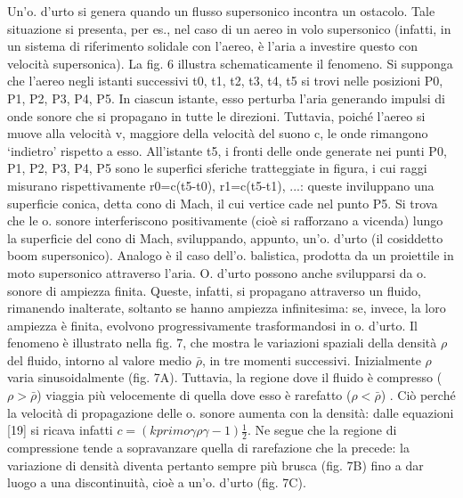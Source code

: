 \documentclass[a4paper]{article}
\begin{document}
Un'o. d'urto si genera quando un flusso supersonico incontra un ostacolo. Tale situazione si presenta, per es., nel caso di un aereo in volo supersonico (infatti, in un sistema di riferimento solidale con l'aereo, è l'aria a investire questo con velocità supersonica). La fig. 6 illustra schematicamente il fenomeno. Si supponga che l'aereo negli istanti successivi t0, t1, t2, t3, t4, t5 si trovi nelle posizioni P0, P1, P2, P3, P4, P5. In ciascun istante, esso perturba l'aria generando impulsi di onde sonore che si propagano in tutte le direzioni. Tuttavia, poiché l'aereo si muove alla velocità v, maggiore della velocità del suono c, le onde rimangono ‘indietro' rispetto a esso. All'istante t5, i fronti delle onde generate nei punti P0, P1, P2, P3, P4, P5 sono le superfici sferiche tratteggiate in figura, i cui raggi misurano rispettivamente r0=c(t5-t0), r1=c(t5-t1), ...: queste inviluppano una superficie conica, detta cono di Mach, il cui vertice cade nel punto P5. Si trova che le o. sonore interferiscono positivamente (cioè si rafforzano a vicenda) lungo la superficie del cono di Mach, sviluppando, appunto, un'o. d'urto (il cosiddetto boom supersonico). 
Analogo è il caso dell'o. balistica, prodotta da un proiettile in moto supersonico attraverso l'aria. O. d'urto possono anche svilupparsi da o. sonore di ampiezza finita. 
Queste, infatti, si propagano attraverso un fluido, rimanendo inalterate, soltanto se hanno ampiezza infinitesima: se, invece, la loro ampiezza è finita, evolvono progressivamente trasformandosi in o. d'urto. Il fenomeno è illustrato nella fig. 7, che mostra le variazioni spaziali della densità $\rho$ del fluido, intorno al valore medio $\bar{\rho}$, in tre momenti successivi. 
Inizialmente $\rho$ varia sinusoidalmente (fig. 7A). Tuttavia, la regione dove il fluido è compresso ($\rho>\bar{\rho}$) viaggia più velocemente di quella dove esso è rarefatto ($\rho<\bar{\rho}$) . 
Ciò perché la velocità di propagazione delle o. sonore aumenta con la densità: dalle equazioni [19] si ricava infatti 
$c=(k primo \gamma\rho \gamma-1)\frac{1}{2}$. 
Ne segue che la regione di compressione tende a sopravanzare quella di rarefazione che la precede: la variazione di densità diventa pertanto sempre più brusca (fig. 7B) fino a dar luogo a una discontinuità, cioè a un'o. d'urto (fig. 7C). 




\begin{small}
 
\end{small}
\end{document}
